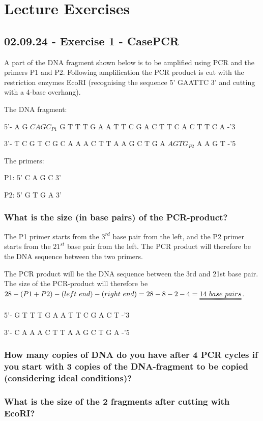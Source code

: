 \chapter{Lecture Exercises}

\section{02.09.24 - Exercise 1 - CasePCR}
A part of the DNA fragment shown below is to be amplified using PCR and the primers P1 and P2. Following amplification the PCR product is cut with the restriction enzymes EcoRI (recognising the sequence 5’ GAATTC 3’ and cutting with a 4-base overhang).

The DNA fragment:

5'-	A G	\underline{$C A G C_{P1}$}	G T	T T	G A	A T	T C	G A	C T	T C	A C	T T	C A	-'3

3'-	T C	G T	C G	C A	A A	C T	T A	A G	C T	G A	\underline{$A G T G_{P2}$}	A A	G T	-'5

The primers:

P1: 5’ C A G C 3’	

P2: 5’ G T G A 3’




\subsection*{What is the size (in base pairs) of the PCR-product?}
The P1 primer starts from the $3^{rd}$ base pair from the left, and the P2 primer starts from the $21^{st}$ base pair from the left. The PCR product will therefore be the DNA sequence between the two primers.

The PCR product will be the DNA sequence between the 3rd and 21st base pair. The size of the PCR-product will therefore be $28 - (P1 + P2) - (left \ end) - (right \ end) = 28 - 8 - 2 - 4 = \uuline{14 \ base \ pairs}$.

5'- G T T T G A A T T C G A C T -'3

3'- C A A A C T T A A G C T G A -'5

\subsection*{How many copies of DNA do you have after 4 PCR cycles if you start with 3 copies of the DNA-fragment to be copied (considering ideal conditions)?}


\subsection*{What is the size of the 2 fragments after cutting with EcoRI?}


